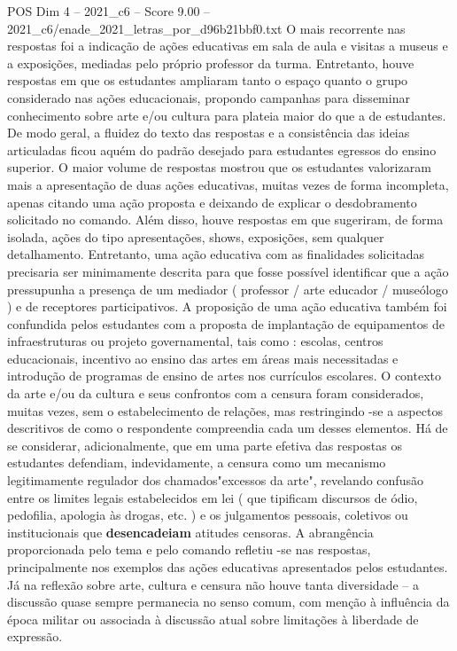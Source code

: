 \begin{textsample}{POS Dim 4 – 2021\_c6 – Score 9.00 – 2021\_c6/enade\_2021\_letras\_por\_d96b21bbf0.txt}
O mais recorrente nas respostas foi a indicação de ações educativas em sala de aula e visitas a museus e a exposições, mediadas pelo próprio professor da turma.
Entretanto, houve respostas em que os estudantes ampliaram tanto o espaço quanto o grupo considerado nas ações educacionais, propondo campanhas para disseminar conhecimento sobre arte e/ou cultura para plateia maior do que a de estudantes.
De modo geral, a fluidez do texto das respostas e a consistência das ideias articuladas ficou aquém do padrão desejado para estudantes egressos do ensino superior.
O maior volume de respostas mostrou que os estudantes valorizaram mais a apresentação de duas ações educativas, muitas vezes de forma incompleta, apenas citando uma ação proposta e deixando de explicar o desdobramento solicitado no comando.
Além disso, houve respostas em que sugeriram, de forma isolada, ações do tipo apresentações, shows, exposições, sem qualquer detalhamento.
Entretanto, uma ação educativa com as finalidades solicitadas precisaria ser minimamente descrita para que fosse possível identificar que a ação pressupunha a presença de um mediador ( professor / arte educador / museólogo ) e de receptores participativos.
A proposição de uma ação educativa também foi confundida pelos estudantes com a proposta de implantação de equipamentos de infraestruturas ou projeto governamental, tais como : escolas, centros educacionais, incentivo ao ensino das artes em áreas mais necessitadas e introdução de programas de ensino de artes nos currículos escolares.
O contexto da arte e/ou da cultura e seus confrontos com a censura foram considerados, muitas vezes, sem o estabelecimento de relações, mas restringindo -se a aspectos descritivos de como o respondente compreendia cada um desses elementos.
Há de se considerar, adicionalmente, que em uma parte efetiva das respostas os estudantes defendiam, indevidamente, a censura como um mecanismo legitimamente regulador dos chamados"excessos da arte", revelando confusão entre os limites legais estabelecidos em lei ( que tipificam discursos de ódio, pedofilia, apologia às drogas, etc. ) e os julgamentos pessoais, coletivos ou institucionais que \textbf{desencadeiam} atitudes censoras.
A abrangência proporcionada pelo tema e pelo comando refletiu -se nas respostas, principalmente nos exemplos das ações educativas apresentados pelos estudantes.
Já na reflexão sobre arte, cultura e censura não houve tanta diversidade – a discussão quase sempre permanecia no senso comum, com menção à influência da época militar ou associada à discussão atual sobre limitações à liberdade de expressão.

\end{textsample}
